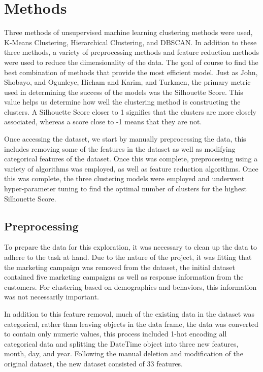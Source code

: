 \documentclass[twocolumn]{article}
\begin{document}
\section{Methods}


Three methods of unsupervised machine learning clustering methods were used, K-Means Clustering, Hierarchical Clustering, and DBSCAN. In addition to these three methods, a variety of preprocessing methods and feature reduction methods were used to reduce the dimensionality of the data. The goal of course to find the best combination of methods that provide the most efficient model. Just as John, Shobayo, and Ogunleye\cite{john}, Hicham and Karim\cite{hicham}, and Turkmen\cite{turkmen}, the primary metric used in determining the success of the models was the Silhouette Score. This value helps us determine how well the clustering method is constructing the clusters. A Silhouette Score closer to 1 signifies that the clusters are more closely associated, whereas a score close to -1 means that they are not.

Once accessing the dataset, we start by manually preprocessing the data, this includes removing some of the features in the dataset as well as modifying categorical features of the dataset. Once this was complete, preprocessing using a variety of algorithms was employed, as well as feature reduction algorithms. Once this was complete, the three clustering models were employed and underwent hyper-parameter tuning to find the optimal number of clusters for the highest Silhouette Score.


\subsection{Preprocessing}

To prepare the data for this exploration, it was necessary to clean up the data to adhere to the task at hand.
Due to the nature of the project, it was fitting that the marketing campaign was removed from the dataset, the initial dataset contained five marketing campaigns as well as response information from the customers. For clustering based on demographics and behaviors, this information was not necessarily important.
 
In addition to this feature removal, much of the existing data in the dataset was categorical, rather than leaving objects
in the data frame, the data was converted to contain only numeric values, this process included 1-hot encoding all categorical
data and splitting the DateTime object into three new features, month, day, and year. Following the manual deletion and modification of the original dataset, the new dataset consisted of 33 features.
\end{document}
